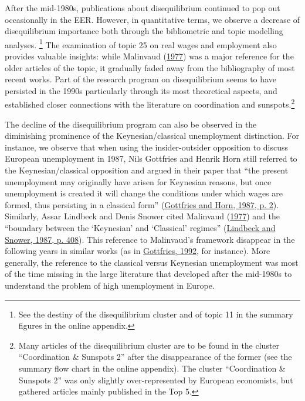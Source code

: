 \documentclass[
  12pt,
  onecolumn]{article}
\begin{document}
After the mid-1980s, publications about disequilibrium continued to pop out occasionally in the EER. However, in quantitative terms, we observe a decrease of disequilibrium importance both through the bibliometric and topic modelling analyses. \footnote{See the destiny of the disequilibrium cluster and of topic 11 in the summary figures in the online appendix.} The examination of topic 25 on real wages and employment also provides valuable insights: while Malinvaud (\protect\hyperlink{ref-malinvaud1977}{1977}) was a major reference for the older articles of the topic, it gradually faded away from the bibliography of most recent works. Part of the research program on disequilibrium seems to have persisted in the 1990s particularly through its most theoretical aspects, and established closer connections with the literature on coordination and sunspots.\footnote{Many articles of the disequilibrium cluster are to be found in the cluster ``Coordination \& Sunspots 2'' after the disappearance of the former (see the summary flow chart in the online appendix). The cluster ``Coordination \& Sunspots 2'' was only slightly over-represented by European economists, but gathered articles mainly published in the Top 5.}

The decline of the disequilibrium program can also be observed in the diminishing prominence of the Keynesian/classical unemployment distinction. For instance, we observe that when using the insider-outsider opposition to discuss European unemployment in 1987, Nils Gottfries and Henrik Horn still referred to the Keynesian/classical opposition and argued in their paper that ``the present unemployment may originally have arisen for Keynesian reasons, but once unemployment is created it will change the conditions under which wages are formed, thus persisting in a classical form'' (\protect\hyperlink{ref-gottfries1987}{Gottfries and Horn, 1987, p. 2}). Similarly, Assar Lindbeck and Denis Snower cited Malinvaud (\protect\hyperlink{ref-malinvaud1977}{1977}) and the ``boundary between the `Keynesian' and `Classical' regimes'' (\protect\hyperlink{ref-lindbeck1987a}{Lindbeck and Snower, 1987, p. 408}). This reference to Malinvaud's framework disappear in the following years in similar works (as in \protect\hyperlink{ref-gottfries1992}{Gottfries, 1992}, for instance). More generally, the reference to the classical versus Keynesian unemployment was most of the time missing in the large literature that developed after the mid-1980s to understand the problem of high unemployment in Europe.
\end{document}

